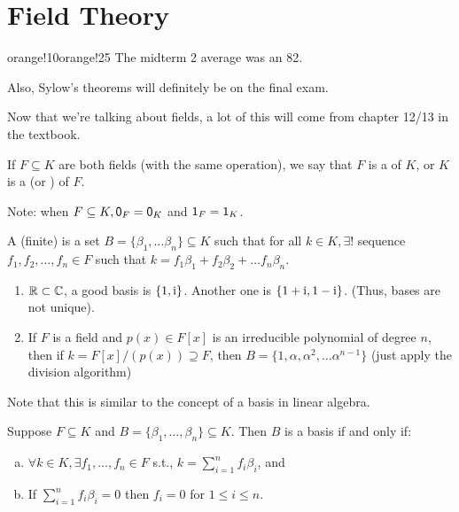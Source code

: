 \documentclass[notes.tex]{subfiles}
\begin{document}
\chapter{Field Theory}
\begin{classnote}{orange!10}{orange!25}
	The midterm 2 average was an 82.

	Also, Sylow's theorems will definitely be on the final exam.

	Now that we're talking about fields, a lot of this will come from chapter 12/13 in the textbook.
\end{classnote}

\begin{defn}
	If $F\subseteq K$ are both fields (with the same operation), we say that $F$ is a  of $K$, or $K$ is a  (or ) of $F$.

	Note: when $F\subseteq K, \mathsf{0}_F = \mathsf{0}_K $ and $\mathsf{1}_F = \mathsf{1}_K$.
\end{defn}

\begin{defn}
	A (finite)  is a set $B = \{\beta_1, \ldots \beta_n\}\subseteq K$ such that for all $k\in K, \exists!$ sequence $f_1, f_2, \ldots, f_n\in F$ such that $k = f_1 \beta_1 + f_2 \beta_2 + \ldots f_n \beta_n$.
\end{defn}

\begin{eg}\leavevmode
	\begin{enumerate}
		\item $\mathbb{R}\subset\mathbb{C}$, a good basis is $\{1, \mathrm{i}\}$. Another one is $\{1+\mathrm{i}, 1-\mathrm{i}\}$. (Thus, bases are not unique).
		\item If $F$ is a field and $p(x) \in F[x]$ is an irreducible polynomial of degree $n$, then if $k = F[x]/(p(x))\supseteq F$, then $B = \{1, \alpha, \alpha^2, \ldots \alpha^{n-1}\}$ (just apply the division algorithm)
	\end{enumerate}
	Note that this is similar to the concept of a basis in linear algebra.
\end{eg}
	
\begin{proposition}
	\label{basisiffzerothing}
	Suppose $F\subseteq K$ and $B = \{\beta_1, \ldots, \beta_n\}\subseteq K$. Then $B$ is a basis if and only if:
	\begin{enumerate}[(a)]
		\item $\forall k\in K, \exists f_1, \ldots, f_n\in F$ s.t., $k = \sum_{i=1}^n f_i \beta_i$, and
		\item If $\sum_{i=1}^n f_i \beta_i = 0$ then $f_i = 0$ for $1\le i \le n$.
	\end{enumerate}
\end{proposition}
\end{document}
